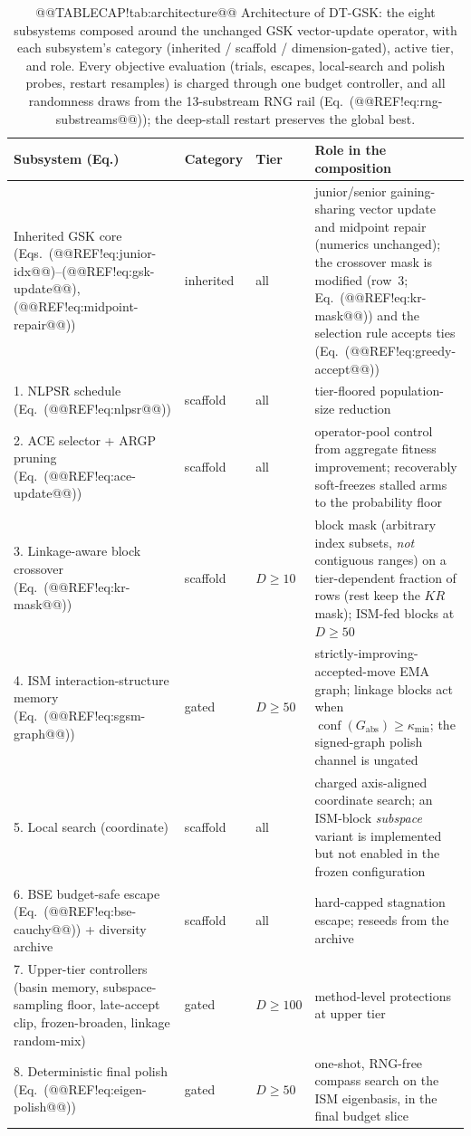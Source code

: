 \documentclass[10pt,a4paper]{article}
\newcommand{\dtgsk}{DT-GSK}
\begin{document}
\begin{table}[t]
\caption{@@TABLECAP!tab:architecture@@ Architecture of \dtgsk{}: the eight subsystems composed
around the unchanged GSK vector-update operator, with each subsystem's category
(inherited / scaffold / dimension-gated), active tier, and role. Every
objective evaluation (trials, escapes, local-search and polish probes,
restart resamples) is charged through one budget controller, and all
randomness draws from the 13-substream RNG rail
(Eq.~(@@REF!eq:rng-substreams@@)); the deep-stall restart preserves the global
best.}
\label{tab:architecture}
\footnotesize
\zebra
\begin{tabular}{p{3.3cm}ll p{6.5cm}}
\toprule
\textbf{Subsystem (Eq.)} & \textbf{Category} & \textbf{Tier} & \textbf{Role in the composition} \\
\midrule
Inherited GSK core (Eqs.~(@@REF!eq:junior-idx@@)--(@@REF!eq:gsk-update@@), (@@REF!eq:midpoint-repair@@)) & inherited & all & junior/senior gaining-sharing vector update and midpoint repair (numerics unchanged); the crossover mask is modified (row~3; Eq.~(@@REF!eq:kr-mask@@)) and the selection rule accepts ties (Eq.~(@@REF!eq:greedy-accept@@)) \\
1. NLPSR schedule (Eq.~(@@REF!eq:nlpsr@@)) & scaffold & all & tier-floored population-size reduction \\
2. ACE selector + ARGP pruning (Eq.~(@@REF!eq:ace-update@@)) & scaffold & all & operator-pool control from aggregate fitness improvement; recoverably soft-freezes stalled arms to the probability floor \\
3. Linkage-aware block crossover (Eq.~(@@REF!eq:kr-mask@@)) & scaffold & $D{\ge}10$ & block mask (arbitrary index subsets, \emph{not} contiguous ranges) on a tier-dependent fraction of rows (rest keep the $KR$ mask); ISM-fed blocks at $D{\ge}50$ \\
4. ISM interaction-structure memory (Eq.~(@@REF!eq:sgsm-graph@@)) & gated & $D{\ge}50$ & strictly-improving-accepted-move EMA graph; linkage blocks act when $\operatorname{conf}(G_{\mathrm{abs}})\ge\kappa_{\min}$; the signed-graph polish channel is ungated \\
5. Local search (coordinate) & scaffold & all & charged axis-aligned coordinate search; an ISM-block \emph{subspace} variant is implemented but not enabled in the frozen configuration \\
6. BSE budget-safe escape (Eq.~(@@REF!eq:bse-cauchy@@)) + diversity archive & scaffold & all & hard-capped stagnation escape; reseeds from the archive \\
7. Upper-tier controllers (basin memory, subspace-sampling floor, late-accept clip, frozen-broaden, linkage random-mix) & gated & $D{\ge}100$ & method-level protections at upper tier \\
8. Deterministic final polish (Eq.~(@@REF!eq:eigen-polish@@)) & gated & $D{\ge}50$ & one-shot, RNG-free compass search on the ISM eigenbasis, in the final budget slice \\
\bottomrule
\end{tabular}
\end{table}
\end{document}
